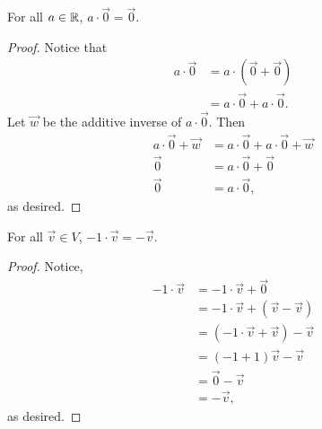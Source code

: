 \begin{theorem}
	For all $a \in \mathbb{R}$, $a \cdot \vec{0} = \vec{0}$.
\end{theorem}
\begin{proof}
	Notice that
	\begin{align*}
		a\cdot\vec{0} &= a\cdot\left(\vec{0} + \vec{0}\right) \\
		&= a\cdot\vec{0} + a\cdot\vec{0}.
	\end{align*}
	Let $\vec{w}$ be the additive inverse of $a\cdot\vec{0}$.
	Then
	\begin{align*}
		a\cdot\vec{0} + \vec{w} &= a\cdot\vec{0} + a\cdot\vec{0} + \vec{w} \\
		\vec{0} &= a\cdot\vec{0} + \vec{0} \\
		\vec{0} &= a\cdot\vec{0},
	\end{align*}
	as desired.
\end{proof}

\begin{theorem}
	For all $\vec{v} \in V$, $-1 \cdot \vec{v} = -\vec{v}$.
\end{theorem}
\begin{proof}
	Notice,
	\begin{align*}
		-1\cdot\vec{v} &= -1\cdot\vec{v} + \vec{0} \\
		&= -1\cdot\vec{v} + \left(\vec{v} -\vec{v}\right) \\
		&= \left(-1\cdot\vec{v} + \vec{v}\right) -\vec{v} \\
		&= \left(-1 + 1\right)\vec{v} -\vec{v} \\
		&= \vec{0} -\vec{v} \\
		&= -\vec{v},
	\end{align*}
	as desired.
\end{proof}

